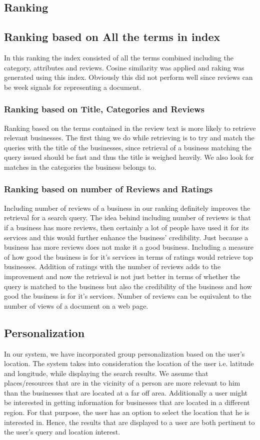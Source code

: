 \documentclass[paper=letter, fontsize=15pt]{article} %
\begin{document}
\subsection{Ranking}
\subsection{Ranking based on All the terms in index}
In this ranking the index consisted of all the terms combined including the category, attributes and reviews. Cosine similarity was applied and raking was generated using this index. Obviously this did not perform well since reviews can be week signals for representing a document.
\subsubsection{Ranking based on Title, Categories and Reviews}
Ranking based on the terms contained in the review text is more likely to retrieve relevant businesses. The first thing we do while retrieving is to try and match the queries with the title of the businesses, since retrieval of a business matching the query issued should be fast and thus the title is weighed heavily. We also look for matches in the categories the business belongs to. 
\subsubsection{Ranking based on number of Reviews and Ratings}
Including number of reviews of a business in our ranking definitely improves the retrieval for a search query. The idea behind including number of reviews is that if a business has more reviews, then certainly a lot of people have used it for its services and this would further enhance the business' credibility. Just because a business has more reviews does not make it a good business. Including a measure of how good the business is for it's services in terms of ratings would retrieve top businesses. Addition of ratings with the number of reviews adds to the improvement and now the retrieval is not just better in terms of whether the query is matched to the business but also the credibility of the business and how good the business is for it's services. Number of reviews can be equivalent to the number of views of a document on a web page.

\subsection{Personalization}
In our system, we have incorporated group personalization based on the user's location. The system takes into consideration the location of the user i.e. latitude and longitude, while displaying the search results. We assume that places/resources that are in the vicinity of a person are more relevant to him than the businesses that are located at a far off area. Additionally a user might be interested in getting information for businesses that are located in a different region. For that purpose, the user has an option to select the location that he is interested in. Hence, the results that are displayed to a user are both pertinent to the user's query and location interest.    
\end{document}

